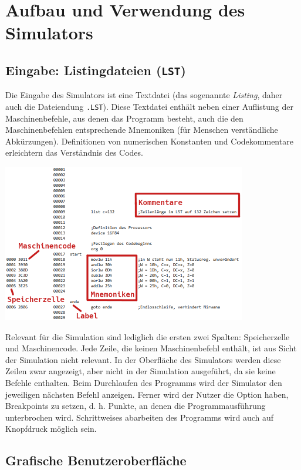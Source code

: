 \documentclass[a4paper]{article}
\begin{document}
\section{Aufbau und Verwendung des Simulators}

\subsection{Eingabe: Listingdateien (\texttt{LST})}

Die Eingabe des Simulators ist eine Textdatei (das sogenannte \textit{Listing}, daher auch die Dateiendung \texttt{.LST}).
Diese Textdatei enthält neben einer Auflistung der Maschinenbefehle, aus denen das Programm besteht, auch die den Maschinenbefehlen entsprechende Mnemoniken (für Menschen verständliche Abkürzungen).
Definitionen von numerischen Konstanten und Codekommentare erleichtern das Verständnis des Codes.

\begin{center}
    \includegraphics[width=0.8\textwidth]{img/proglisting}
\end{center}

Relevant für die Simulation sind lediglich die ersten zwei Spalten: Speicherzelle und Maschinencode.
Jede Zeile, die keinen Maschinenbefehl enthält, ist aus Sicht der Simulation nicht relevant.
In der Oberfläche des Simulators werden diese Zeilen zwar angezeigt, aber nicht in der Simulation ausgeführt, da sie keine Befehle enthalten.
Beim Durchlaufen des Programms wird der Simulator den jeweiligen nächsten Befehl anzeigen.
Ferner wird der Nutzer die Option haben, Breakpoints zu setzen, d. h. Punkte, an denen die Programmausführung unterbrochen wird.
Schrittweises abarbeiten des Programms wird auch auf Knopfdruck möglich sein.

\subsection{Grafische Benutzeroberfläche}
\end{document}
